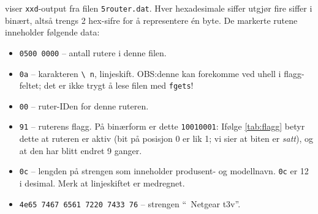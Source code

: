 \documentclass[norsk]{article}
\begin{document}
\noindent {} viser \texttt{xxd}-output fra filen \texttt{5router.dat}. Hver hexadesimale siffer utgjør fire siffer i binært, altså trengs 2 hex-sifre for å representere én byte. De markerte rutene inneholder følgende data: 

\begin{itemize}
    \item \texttt{0500 0000} -- antall rutere i denne filen\footnotemark.
    \item \texttt{0a} -- karakteren \texttt{\textbackslash~n}, linjeskift. OBS:\@ denne kan forekomme ved uhell i flagg-feltet; det er ikke trygt å lese filen med \texttt{fgets}!
    \item \texttt{00} -- ruter-IDen for denne ruteren.
    \item \texttt{91} -- ruterens flagg. På binærform er dette \texttt{10010001}: Ifølge \cref{tab:flagg} betyr dette at ruteren er aktiv (bit på posisjon 0 er lik 1; vi sier at biten er \textit{satt}), og at den har blitt endret 9 ganger.
    \item \texttt{0c} -- lengden på strengen som inneholder produsent- og modellnavn. \texttt{0c} er 12 i desimal. Merk at linjeskiftet er medregnet.
    \item \texttt{4e65 7467 6561 7220 7433 76} -- strengen \textquotedblleft~Netgear t3v\textquotedblright.
\end{itemize}

\end{document}
